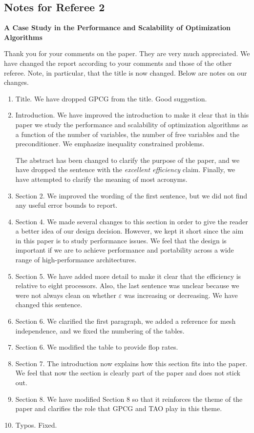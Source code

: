\documentclass[11pt]{article}
\begin{document}
\setlength{\baselineskip}{15pt}

\pagestyle {plain}

\subsection*{Notes for Referee 2}


\begin{center}
\textbf{A Case Study in the Performance and Scalability of
Optimization Algorithms}
\end{center}

Thank you for your comments on the paper. They are very much
appreciated.
We have changed the report according to your comments and those
of the other referee. Note, in particular, that the title is now changed.
Below are notes on our changes. 

\begin{enumerate}
\item
Title. We have dropped GPCG from the title. Good suggestion.
\item
Introduction.
We have improved the introduction to make it clear that
in this paper we study the performance and scalability
of optimization algorithms as a function of the 
number of variables, the number of free variables and the preconditioner.
We emphasize inequality constrained problems.

The abstract has been changed to clarify the purpose of the paper,
and we have dropped the sentence with the 
\textit{excellent efficiency} claim. 
Finally, we have attempted to clarify the meaning of most
acronyms.
\item
Section 2.
We improved the wording of the first sentence, but we did not
find any useful error bounds to report.
\item
Section 4.
We made several changes to this section in order to give
the reader a better idea of our design decision. However,
we kept it short since the aim in this paper is to study
performance issues.
We feel that the design is important if we are to achieve 
performance and portability across a wide range of high-performance
architectures.
\item
Section 5.
We have added more detail to make it clear that the
efficiency is relative to eight processors.
Also, the last sentence was unclear because we were not always
clean on whether $ \varepsilon $ was increasing or decreasing.
We have changed this sentence.
\item
Section 6.
We clarified the first paragraph, we added a reference
for mesh independence, and we fixed the numbering of the tables.
\item
Section 6.
We modified the table to provide flop rates.
\item
Section 7.
The introduction now explains how this section fits into
the paper. We feel that now the section is clearly
part of the paper and does not stick out.
\item
Section 8.
We have modified Section 8 so that it reinforces the theme
of the paper and clarifies the role that GPCG and TAO
play in this theme.
\item
Typos. Fixed.
\end{enumerate}
\end{document}
